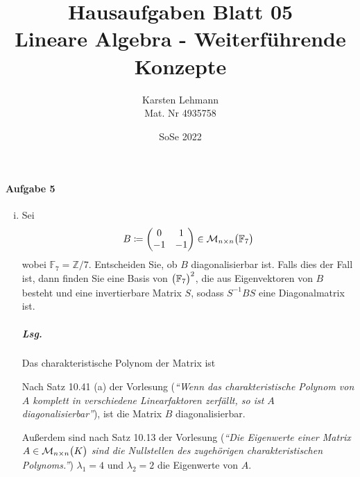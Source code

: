 \documentclass{scrreprt}
\author{Karsten Lehmann\\Mat. Nr 4935758}
\date{SoSe 2022}
\title{Hausaufgaben Blatt 05\\Lineare Algebra - Weiterführende Konzepte}
\begin{document}
\paragraph{Aufgabe 5}
\begin{enumerate}[(i)]
\item Sei
  \[
    B \coloneqq \begin{pmatrix}
      0 & 1 \\
      -1 & -1 \\
    \end{pmatrix} \in \mathcal{M}_{n \times n}\qty\big(\mathbb{F}_7)
  \]
  wobei $\mathbb{F}_7 = \mathbb{Z}/7$.
  Entscheiden Sie, ob $B$ diagonalisierbar ist.
  Falls dies der Fall ist, dann finden Sie eine Basis von
  $\qty\big(\mathbb{F}_7)^2$, die aus Eigenvektoren von $B$
  besteht und eine invertierbare Matrix $S$, sodass $S^{-1}BS$ eine
  Diagonalmatrix ist.

  \subparagraph{Lsg.} Das charakteristische Polynom der Matrix ist
  Nach Satz 10.41 (a) der Vorlesung (\emph{``Wenn das charakteristische
    Polynom von $A$ komplett in verschiedene Linearfaktoren zerfällt, so ist
    $A$ diagonalisierbar''}), ist die Matrix $B$ diagonalisierbar.

  Außerdem sind nach Satz 10.13 der Vorlesung (\emph{``Die Eigenwerte einer
    Matrix $A \in \mathcal{M}_{n \times n}\qty\big(K)$ sind die Nullstellen
    des zugehörigen charakteristischen Polynoms.''}) $\lambda_1 = 4$ und
  $\lambda_2 = 2$ die Eigenwerte von $A$.


\end{enumerate}
\end{document}
